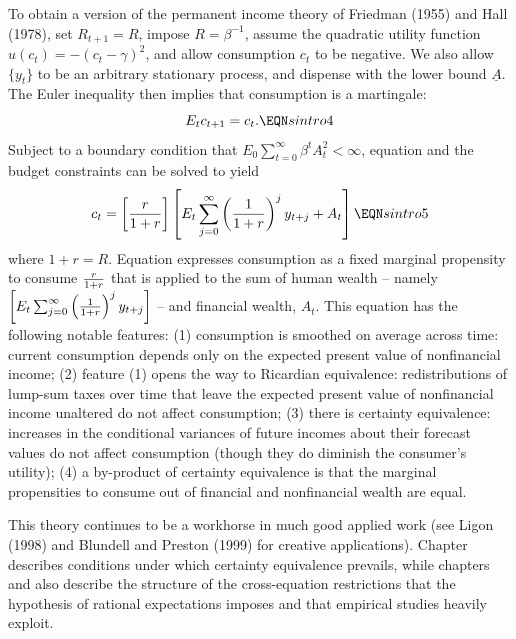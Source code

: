   To obtain a version of the permanent income theory  of
Friedman (1955) and Hall (1978), set $R_{t+1} =R$, impose
$R=\beta^{-1}$, assume the quadratic utility function
$u(c_t)=-(c_t-\gamma)^2$, and allow consumption $c_t$ to
be negative. We also allow
$\{y_t\}$ to be an arbitrary  stationary
process, and dispense with the lower bound $\underline A$.
 The Euler inequality  then implies that consumption is
a martingale:
$$ E_t c_{t+1} = c_t.  \EQN sintro4 $$
Subject to a boundary condition  that
 $E_0 \sum_{t=0}^\infty \beta^t A_t^2 <\infty$,
equation  and  the budget constraints  can be solved
to yield
$$ c_t = \left[{r \over 1+r}\right]
\left[E_t \sum_{j=0}^\infty
 \left({1 \over 1+r}\right)^j y_{t+j} + A_t \right]
\EQN sintro5 $$
where $1+r = R$.  Equation 
expresses consumption as a fixed marginal propensity to consume
${r \over 1+r}$ that is applied to the sum of human wealth -- namely
$\left[E_t \sum_{j=0}^\infty
 \left({1 \over 1+r}\right)^j y_{t+j}\right] $ -- and
 financial wealth, $A_t$.
This equation has the following notable features:
(1) consumption is smoothed on average across time: current
consumption depends only on the expected present value of nonfinancial
income;
(2)  feature (1) opens the way to Ricardian equivalence: redistributions
of lump-sum taxes over time that leave  the expected present value of
nonfinancial income unaltered do not affect consumption;
(3) there is certainty equivalence: increases in the conditional variances
of future incomes about  their forecast values do not affect consumption
(though they do diminish the consumer's utility);
(4) a by-product of certainty equivalence is that   the marginal propensities
to consume out of financial and nonfinancial wealth are equal.


 
%
This theory continues to be a workhorse in much
good applied  work (see Ligon (1998)
and  Blundell and
Preston (1999) for creative applications).
Chapter  describes  conditions under which
certainty equivalence prevails, while chapters  and 
  also describe the structure of the cross-equation
restrictions   that the hypothesis of rational expectations imposes and that
 empirical studies
heavily exploit.







